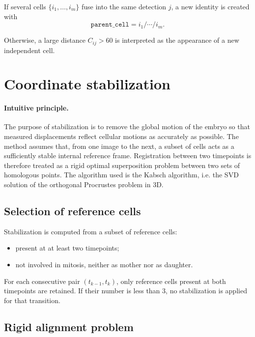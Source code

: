 \documentclass[11pt,a4paper]{article}
\begin{document}
If several cells $\{i_1,\dots,i_m\}$ fuse into the same detection $j$, a new identity is created with
\[
\texttt{parent\_cell}=i_1/\cdots/i_m.
\]

Otherwise, a large distance $C_{ij}>60$ is interpreted as the appearance of a new independent cell.

\section{Coordinate stabilization}

\paragraph{Intuitive principle.}
The purpose of stabilization is to remove the global motion of the embryo so that measured displacements reflect cellular motions as accurately as possible. The method assumes that, from one image to the next, a subset of cells acts as a sufficiently stable internal reference frame. Registration between two timepoints is therefore treated as a rigid optimal superposition problem between two sets of homologous points. The algorithm used is the Kabsch algorithm, i.e. the SVD solution of the orthogonal Procrustes problem in 3D.

\subsection{Selection of reference cells}

Stabilization is computed from a subset of reference cells:
\begin{itemize}
  \item present at at least two timepoints;
  \item not involved in mitosis, neither as mother nor as daughter.
\end{itemize}

For each consecutive pair $(t_{k-1},t_k)$, only reference cells present at both timepoints are retained. If their number is less than $3$, no stabilization is applied for that transition.

\subsection{Rigid alignment problem}
\end{document}
